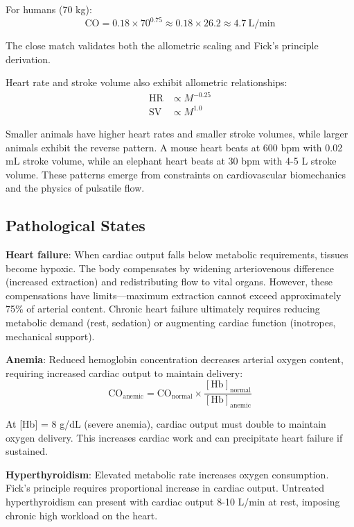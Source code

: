 For humans (70 kg):
\begin{equation}
\mathrm{CO} = 0.18 \times 70^{0.75} \approx 0.18 \times 26.2 \approx 4.7~\mathrm{L/min}
\end{equation}

The close match validates both the allometric scaling and Fick's principle derivation.

Heart rate and stroke volume also exhibit allometric relationships:
\begin{align}
\mathrm{HR} &\propto M^{-0.25} \\
\mathrm{SV} &\propto M^{1.0}
\end{align}

Smaller animals have higher heart rates and smaller stroke volumes, while larger animals exhibit the reverse pattern. A mouse heart beats at 600 bpm with 0.02 mL stroke volume, while an elephant heart beats at 30 bpm with 4-5 L stroke volume. These patterns emerge from constraints on cardiovascular biomechanics and the physics of pulsatile flow.

\subsection{Pathological States}

\textbf{Heart failure}: When cardiac output falls below metabolic requirements, tissues become hypoxic. The body compensates by widening arteriovenous difference (increased extraction) and redistributing flow to vital organs. However, these compensations have limits—maximum extraction cannot exceed approximately 75\% of arterial content. Chronic heart failure ultimately requires reducing metabolic demand (rest, sedation) or augmenting cardiac function (inotropes, mechanical support).

\textbf{Anemia}: Reduced hemoglobin concentration decreases arterial oxygen content, requiring increased cardiac output to maintain delivery:
\begin{equation}
\mathrm{CO}_{\mathrm{anemic}} = \mathrm{CO}_{\mathrm{normal}} \times \frac{[\mathrm{Hb}]_{\mathrm{normal}}}{[\mathrm{Hb}]_{\mathrm{anemic}}}
\end{equation}

At [Hb] = 8 g/dL (severe anemia), cardiac output must double to maintain oxygen delivery. This increases cardiac work and can precipitate heart failure if sustained.

\textbf{Hyperthyroidism}: Elevated metabolic rate increases oxygen consumption. Fick's principle requires proportional increase in cardiac output. Untreated hyperthyroidism can present with cardiac output 8-10 L/min at rest, imposing chronic high workload on the heart.

